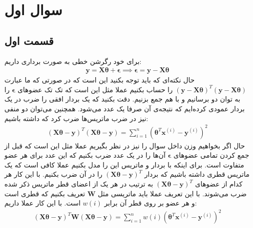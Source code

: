 \documentclass[]{article}
\begin{document}
\printheader

\section*{سوال اول}
\subsection*{قسمت اول}
برای خود رگرشن خطی به صورت برداری داریم:
\begin{gather*}
    \mathbf{y} = \mathbf{X} \mathbf{\theta} + \mathbf{\epsilon} \implies
    \mathbf{\epsilon} = \mathbf{y} - \mathbf{X} \mathbf{\theta}
\end{gather*}
حال نکته‌ای که باید توجه بکنید این است که در صورتی که ما عبارت
$(\mathbf{y} - \mathbf{X} \mathbf{\theta})^T(\mathbf{y} - \mathbf{X} \mathbf{\theta})$
را حساب بکنیم عملا مثل این است که تک تک عضو‌های
$\mathbf{\epsilon}$
را به توان دو برسانیم و با هم جمع بزنیم.
دقت بکنید که یک بردار افقی را ضرب در یک بردار عمودی کرده‌ایم که نتیجه‌ی آن صرفا یک عدد می‌شود.
همچنین می‌توان دو منفی نیز در ضرب ماتریس‌ها ضرب کرد که داشته باشیم:
\begin{gather*}
    (\mathbf{X} \mathbf{\theta} - \mathbf{y})^T(\mathbf{X} \mathbf{\theta} - \mathbf{y})
    =
    \sum_{i=1}^n (\mathbf{\theta}^T \mathbf{x}^{(i)} - \mathbf{y}^{(i)})^2
\end{gather*}
حال اگر بخواهیم وزن داخل سوال را نیز در نظر بگیریم عملا مثل این است که قبل از جمع کردن تمامی
عضو‌های
$\mathbf{\epsilon}$
آن‌ها را در یک عدد ضرب بکنیم که این عدد برای هر عضو متفاوت است. برای اینکه با بردار و ماتریس
این را مدل بکنیم عملا کافی است که یک ماتریس قطری داشته باشیم که بردار
$(\mathbf{X} \mathbf{\theta} - \mathbf{y})^T$
را در آن ضرب بکنیم. با این کار هر کدام از عضو‌‌های
$(\mathbf{X} \mathbf{\theta} - \mathbf{y})^T$
به ترتیب در هر یک از اعضای قطر ماتریس ذکر شده ضرب می‌شوند. با این تعریف عملا باید ماتریسی مثل
$\mathbf{W}$
تعریف بکنیم که قطری است و هر عضو بر روی قطر آن برابر
$w(i)$
است. با این کار عملا داریم:
\begin{gather*}
    (\mathbf{X} \mathbf{\theta} - \mathbf{y})^T \mathbf{W} (\mathbf{X} \mathbf{\theta} - \mathbf{y})
    =
    \sum_{i=1}^n w(i) (\mathbf{\theta}^T \mathbf{x}^{(i)} - \mathbf{y}^{(i)})^2
\end{gather*}
\end{document}
